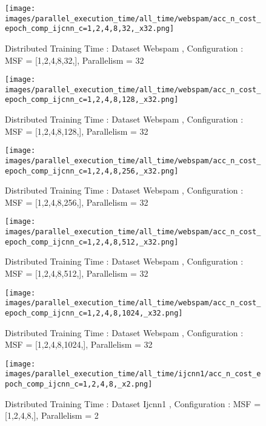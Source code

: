 \begin{figure*}[htbp]
\centering
\texttt{[image: images/parallel\_execution\_time/all\_time/webspam/acc\_n\_cost\_epoch\_comp\_ijcnn\_c=1,2,4,8,32,\_x32.png]}
\caption{Distributed Training Time : Dataset Webspam , Configuration : MSF = [1,2,4,8,32,], Parallelism = 32}
\label{fig:dis-msf-tr-time-webspam-x32}
\end{figure*}


\begin{figure*}[htbp]
\centering
\texttt{[image: images/parallel\_execution\_time/all\_time/webspam/acc\_n\_cost\_epoch\_comp\_ijcnn\_c=1,2,4,8,128,\_x32.png]}
\caption{Distributed Training Time : Dataset Webspam , Configuration : MSF = [1,2,4,8,128,], Parallelism = 32}
\label{fig:dis-msf-tr-time-webspam-x32}
\end{figure*}


\begin{figure*}[htbp]
\centering
\texttt{[image: images/parallel\_execution\_time/all\_time/webspam/acc\_n\_cost\_epoch\_comp\_ijcnn\_c=1,2,4,8,256,\_x32.png]}
\caption{Distributed Training Time : Dataset Webspam , Configuration : MSF = [1,2,4,8,256,], Parallelism = 32}
\label{fig:dis-msf-tr-time-webspam-x32}
\end{figure*}


\begin{figure*}[htbp]
\centering
\texttt{[image: images/parallel\_execution\_time/all\_time/webspam/acc\_n\_cost\_epoch\_comp\_ijcnn\_c=1,2,4,8,512,\_x32.png]}
\caption{Distributed Training Time : Dataset Webspam , Configuration : MSF = [1,2,4,8,512,], Parallelism = 32}
\label{fig:dis-msf-tr-time-webspam-x32}
\end{figure*}


\begin{figure*}[htbp]
\centering
\texttt{[image: images/parallel\_execution\_time/all\_time/webspam/acc\_n\_cost\_epoch\_comp\_ijcnn\_c=1,2,4,8,1024,\_x32.png]}
\caption{Distributed Training Time : Dataset Webspam , Configuration : MSF = [1,2,4,8,1024,], Parallelism = 32}
\label{fig:dis-msf-tr-time-webspam-x32}
\end{figure*}


\begin{figure*}[htbp]
\centering
\texttt{[image: images/parallel\_execution\_time/all\_time/ijcnn1/acc\_n\_cost\_epoch\_comp\_ijcnn\_c=1,2,4,8,\_x2.png]}
\caption{Distributed Training Time : Dataset Ijcnn1 , Configuration : MSF = [1,2,4,8,], Parallelism = 2}
\label{fig:dis-msf-tr-time-ijcnn1-x2}
\end{figure*}



